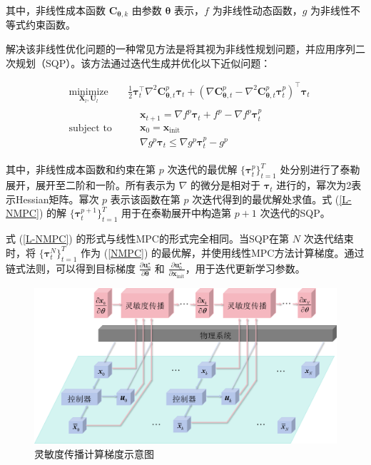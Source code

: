 \documentclass[lang=chs, degree=master, blindreview=true, winfonts=true]{yanputhesis}
\begin{document}
其中，非线性成本函数 \( \bm C_{\bm \theta,k} \) 由参数 \( \bm \theta \) 表示，\( f \) 为非线性动态函数，\( g \) 为非线性不等式约束函数。

解决该非线性优化问题的一种常见方法是将其视为非线性规划问题，并应用序列二次规划（SQP）。该方法通过迭代生成并优化以下近似问题：

\begin{equation}
\begin{aligned} 
&\operatorname*{minimize}_{\bm{X}_l, \bm{U}_l} & & \frac{1}{2}\bm{\tau}_{t}^{\top}\nabla^{2}\bm C_{\bm \theta,t}^{p}\bm{\tau}_{t}+(\nabla \bm C_{\bm \theta,t}^{p}-\nabla^{2}\bm C_{\bm \theta,t}^{p}\bm{\tau}_{t}^{p})^{\top}\bm{\tau}_{t} \\
&\text{subject to} & & \begin{aligned}
& \bm{x}_{t+1}=\nabla f^{p}\bm{\tau}_{t}+f^{p}-\nabla f^{p}\bm{\tau}_{t}^{p} \\
& \bm{x}_{0} = \bm{x}_\text{init} \\
& \nabla g^{p}\bm{\tau}_{t}\leq\nabla g^{p}\bm{\tau}_{t}^{p}-g^{p}	
\end{aligned}
\end{aligned}	
\label{L-NMPC}
\end{equation}

其中，非线性成本函数和约束在第 \(p\) 次迭代的最优解 \( \{\bm  \tau_t^p \}_{t=1}^{T} \) 处分别进行了泰勒展开，展开至二阶和一阶。所有表示为 \( \nabla \) 的微分是相对于 \( \bm \tau_t \) 进行的，幂次为2表示Hessian矩阵。幂次 \( p \) 表示该函数在第 \( p \) 次迭代得到的最优解处求值。式 (\ref{L-NMPC}) 的解 \( \{\bm \tau_t^{p+1} \}_{t=1}^{T} \) 用于在泰勒展开中构造第 \( p+1 \) 次迭代的SQP。

式 (\ref{L-NMPC}) 的形式与线性MPC的形式完全相同。当SQP在第 \( N \) 次迭代结束时，将 \( \{\bm \tau_t^N \}_{t=1}^{T} \) 作为 (\ref{NMPC}) 的最优解，并使用线性MPC方法计算梯度\cite{tao2024difftune}。通过链式法则，可以得到目标梯度 \( \frac{\partial \bm u_0^\star}{\partial \bm \theta} \) 和 \( \frac{\partial \bm u_0^\star}{\partial \bm x_{\text{init}}} \)，用于迭代更新学习参数。

\begin{figure}[hbt!]
	\centering
	\includegraphics[width=32pc]{picture/图片1.png} 
	\caption{灵敏度传播计算梯度示意图} 
	\label{system}
\end{figure}
\end{document}
